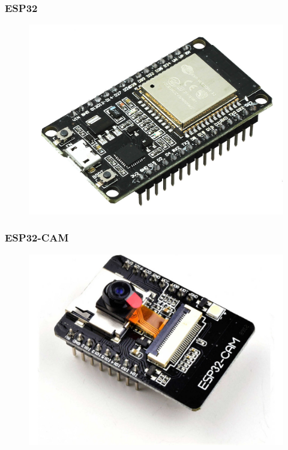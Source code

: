 \documentclass[12pt]{beamer}
\begin{document}
\begin{frame}
    \frametitle{ESP32}
    \begin{figure}[!h]
        \centering
        \includegraphics[width=.70\textwidth]{esp}
    \end{figure}
\end{frame}

\begin{frame}
    \frametitle{ESP32-CAM}
    \begin{figure}[!h]
        \centering
        \includegraphics[width=.7\textwidth]{espcam}
    \end{figure}
\end{frame}
\end{document}
